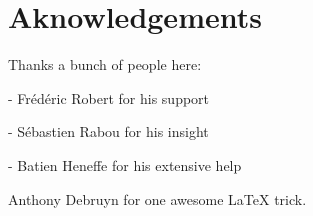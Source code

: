 \chapter*{Aknowledgements}

Thanks a bunch of people here:

- Frédéric Robert for his support

- Sébastien Rabou for his insight

- Batien Heneffe for his extensive help

Anthony Debruyn for one awesome LaTeX trick.